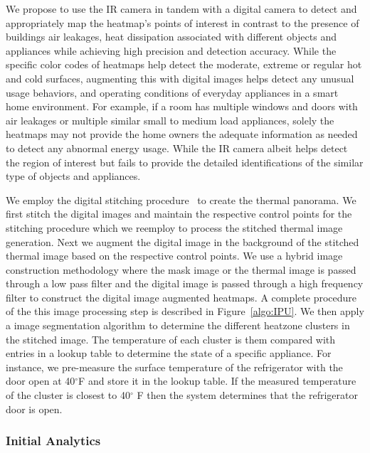 \documentclass{sig-alternate}
\begin{document}
\indent We propose to use the IR camera in tandem with a digital camera to detect and appropriately map the heatmap's points of interest in contrast to the presence of buildings air leakages, heat dissipation associated with different objects and appliances while achieving high precision and detection accuracy. While the specific color codes of heatmaps help detect the moderate, extreme or regular hot and cold surfaces, augmenting this with digital images helps detect any unusual usage behaviors, and operating conditions of everyday appliances in a smart home environment. For example, if a room has multiple windows and doors with air leakages or multiple similar small to medium load appliances, solely the heatmaps may not provide the home owners the adequate information as needed to detect any abnormal energy usage. While the IR camera albeit helps detect the region of interest but fails to provide the detailed identifications of the similar type of objects and appliances.

 
We employ the digital stitching procedure~\cite{Stitch} to create the thermal panorama. We first stitch the digital images and maintain the respective control points for the stitching procedure which we reemploy to process the stitched thermal image generation. Next we augment the digital image in the background of the stitched thermal image based on the respective control points.%
 We use a hybrid image construction methodology where the mask image or the thermal image is passed through a low pass filter and the digital image is passed through a high frequency filter to construct the digital image augmented heatmaps. A complete procedure of the this image processing step is described in Figure~\ref{algo:IPU}. We then apply a image segmentation algorithm to determine the different heatzone clusters in the stitched image. The temperature of each cluster is them compared with entries in a lookup table to determine the state of a specific appliance. For instance, we pre-measure the surface temperature of the refrigerator with the door open at 40$^{\circ}$F  and store it in the lookup table. If the measured temperature of the cluster is closest to 40$^{\circ}$ F then the system determines that the refrigerator door is open.
 
\subsubsection{\textbf{Initial Analytics}}
\end{document}
